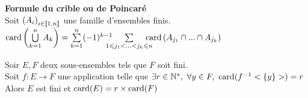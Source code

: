 \documentclass[12pt,twoside,a4paper]{article}
\begin{document}
	\begin{prop}
		\textbf{Formule du crible ou de Poincar\'e}\\
		Soit $\left(A_i \right)_{i\in [\![ 1,n]\!]}$ une famille d'ensembles finis.\\
		$\card\left(\bigcup\limits^{n}_{k=1}A_k \right)=\sum\limits^{n}_{k=1} (-1)^{k-1}\!\!\!\!\!\!\sum\limits_{1\leqslant j_1<...<j_k\leqslant n}\!\!\!\!\!\! \card\left(A_{j_1}\cap...\cap A_{j_k} \right)$
	\end{prop}
	\begin{prop}
		Soir $E,F$ deux sous-ensembles tels que $F$ soit fini.\\
		Soit $f:E\rightarrow F$ une application telle que $\exists r\in\mathbb{N}^{*},\ \forall y\in F,\ \text{card}(f^{-1}<\{y\}>)=r$\\
		Alors $E$ est fini et $\text{card}(E)=r\times \text{card}(F)$
	\end{prop}
\end{document}
